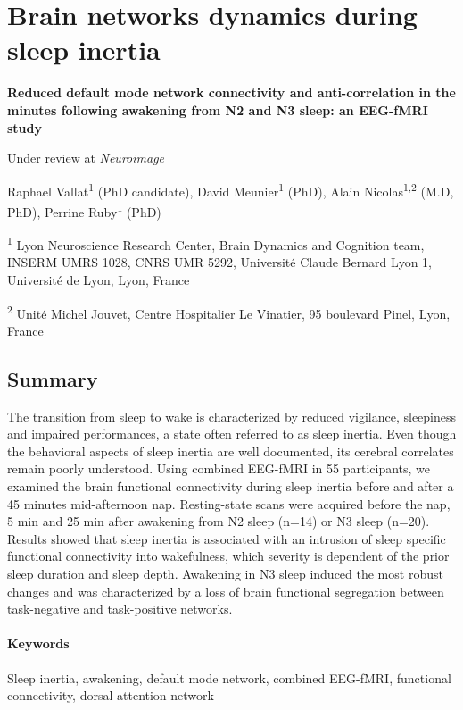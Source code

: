 \section{Brain networks dynamics during sleep inertia}
\label{res:inertia:inertia}

\bigskip

\textbf{{\large Reduced default mode network connectivity and anti-correlation in the minutes following awakening from N2 and N3 sleep: an EEG-fMRI study}}

\hfill Under review at \emph{Neuroimage}

\bigskip

Raphael Vallat\textsuperscript{1} (PhD candidate), David Meunier\textsuperscript{1} (PhD), Alain Nicolas\textsuperscript{1,2} (M.D, PhD), Perrine Ruby\textsuperscript{1} (PhD)

\textsuperscript{1} Lyon Neuroscience Research Center, Brain Dynamics and Cognition team, INSERM UMRS 1028, CNRS UMR 5292, Université Claude Bernard Lyon 1, Université de Lyon, Lyon, France

\textsuperscript{2} Unité Michel Jouvet, Centre Hospitalier Le Vinatier, 95 boulevard Pinel, Lyon, France

\subsection*{Summary}
\label{res:inertia:inertia:summary}

The transition from sleep to wake is characterized by reduced vigilance, sleepiness and impaired performances, a state often referred to as sleep inertia. Even though the behavioral aspects of sleep inertia are well documented, its cerebral correlates remain poorly understood. Using combined EEG-fMRI in 55 participants, we examined the brain functional connectivity during sleep inertia before and after a 45 minutes mid-afternoon nap. Resting-state scans were acquired before the nap, 5 min and 25 min after awakening from N2 sleep (n=14) or N3 sleep (n=20). Results showed that sleep inertia is associated with an intrusion of sleep specific functional connectivity into wakefulness, which severity is dependent of the prior sleep duration and sleep depth. Awakening in N3 sleep induced the most robust changes and was characterized by a loss of brain functional segregation between task-negative and task-positive networks.

\paragraph{Keywords}
Sleep inertia, awakening, default mode network, combined EEG-fMRI, functional connectivity, dorsal attention network

